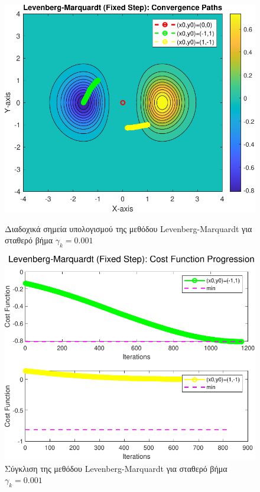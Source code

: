 \documentclass[a4paper,12pt]{article}
\begin{document}
\begin{figure}[h]
    \centering
    \begin{minipage}{0.47\textwidth}
        \centering
        \includegraphics[width=1\linewidth]{plot/levenberg_marquardt_fixed_step_contour.pdf}
        \caption{\small Διαδοχικά σημεία υπολογισμού της μεθόδου Levenberg-Marquardt για σταθερό βήμα $\gamma_k=0.001$}
        \label{fig:levenberg_marquardt_fixed_step_contour}
    \end{minipage} \hfill
    \begin{minipage}{0.47\textwidth}
        \centering
        \includegraphics[width=1\linewidth]{plot/levenberg_marquardt_fixed_step_costs.pdf}
        \caption{\small Σύγκλιση της μεθόδου Levenberg-Marquardt για σταθερό βήμα $\gamma_k=0.001$}
        \label{fig:levenberg_marquardt_fixed_step_costs}
    \end{minipage}
\end{figure}
\end{document}
